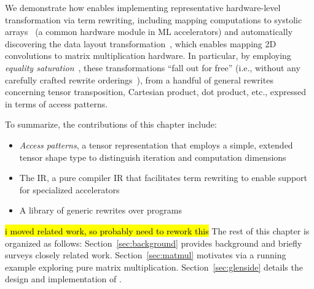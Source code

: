 We demonstrate how \g
  enables implementing representative
  hardware-level transformation via term rewriting,
  including mapping computations
  to systolic arrays~\cite{jouppi2017tpu}
  (a common hardware module in ML accelerators)
  and automatically discovering the
   data layout transformation~\cite{im2col},
  which enables mapping 2D convolutions
  to matrix multiplication hardware.
In particular,
  by employing \textit{equality saturation}~\cite{willsey2021egg},
  these transformations ``fall out for free''
  (i.e., without any carefully crafted
  rewrite orderings~\cite{phase-ordering}),
  from a handful of general rewrites concerning tensor
  transposition, Cartesian product, dot product, etc.,
  expressed in terms of access patterns.

To summarize, the contributions of this chapter include:
\begin{itemize}
\item \textit{Access patterns},
  a tensor representation that employs a
  simple, extended tensor shape type to
  distinguish iteration and computation dimensions

\item The \g IR,
  a pure compiler IR that facilitates 
  term rewriting to enable support for
  specialized accelerators
  
\item A library of generic rewrites over \g programs
  
\end{itemize}

\hl{i moved related work, so probably need to rework this}
The rest of this chapter is organized as follows:
Section~\ref{sec:background} provides background
  and briefly surveys closely related work.
Section~\ref{sec:matmul} motivates
  \g via a running example exploring
  pure matrix multiplication.
Section~\ref{sec:glenside} details the
  design and implementation of \g.
